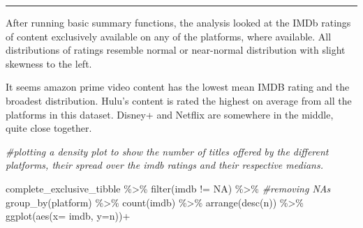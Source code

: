 \documentclass[
]{article}
\newenvironment{Shaded}{\begin{snugshade}}{\end{snugshade}}
\newcommand{\AttributeTok}[1]{\textcolor[rgb]{0.77,0.63,0.00}{#1}}
\newcommand{\CommentTok}[1]{\textcolor[rgb]{0.56,0.35,0.01}{\textit{#1}}}
\newcommand{\FunctionTok}[1]{\textcolor[rgb]{0.00,0.00,0.00}{#1}}
\newcommand{\NormalTok}[1]{#1}
\newcommand{\SpecialCharTok}[1]{\textcolor[rgb]{0.00,0.00,0.00}{#1}}
\newcommand{\StringTok}[1]{\textcolor[rgb]{0.31,0.60,0.02}{#1}}
\begin{document}
\begin{center}\rule{0.5\linewidth}{0.5pt}\end{center}

After running basic summary functions, the analysis looked at the IMDb
ratings of content exclusively available on any of the platforms, where
available. All distributions of ratings resemble normal or near-normal
distribution with slight skewness to the left.

It seems amazon prime video content has the lowest mean IMDB rating and
the broadest distribution. Hulu's content is rated the highest on
average from all the platforms in this dataset. Disney+ and Netflix are
somewhere in the middle, quite close together.

\begin{Shaded}
\begin{Highlighting}[]
\CommentTok{\#plotting a density plot to show the number of titles offered by the different platforms, their spread over the imdb ratings and their respective medians.}

\NormalTok{complete\_exclusive\_tibble }\SpecialCharTok{\%\textgreater{}\%} 
  \FunctionTok{filter}\NormalTok{(imdb }\SpecialCharTok{!=} \StringTok{\textquotesingle{}NA\textquotesingle{}}\NormalTok{) }\SpecialCharTok{\%\textgreater{}\%} \CommentTok{\#removing NA\textquotesingle{}s}
  \FunctionTok{group\_by}\NormalTok{(platform) }\SpecialCharTok{\%\textgreater{}\%} 
  \FunctionTok{count}\NormalTok{(imdb) }\SpecialCharTok{\%\textgreater{}\%} 
  \FunctionTok{arrange}\NormalTok{(}\FunctionTok{desc}\NormalTok{(n)) }\SpecialCharTok{\%\textgreater{}\%} 
  \FunctionTok{ggplot}\NormalTok{(}\FunctionTok{aes}\NormalTok{(}\AttributeTok{x=}\NormalTok{ imdb, }\AttributeTok{y=}\NormalTok{n))}\SpecialCharTok{+}
  

\end{Highlighting}
\end{Shaded}
\end{document}
